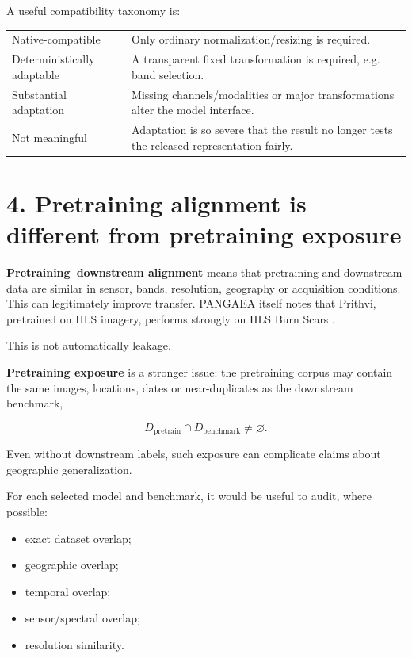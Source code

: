\documentclass[11pt,a4paper]{article}
\begin{document}
A useful compatibility taxonomy is:

\begin{center}
\begin{tabular}{>{\raggedright\arraybackslash}p{3.6cm}
                >{\raggedright\arraybackslash}p{9.0cm}}
\toprule
Native-compatible & Only ordinary normalization/resizing is required. \\
Deterministically adaptable & A transparent fixed transformation is required, e.g. band selection. \\
Substantial adaptation & Missing channels/modalities or major transformations alter the model interface. \\
Not meaningful & Adaptation is so severe that the result no longer tests the released representation fairly. \\
\bottomrule
\end{tabular}
\end{center}

\section{4. Pretraining alignment is different from pretraining exposure}

\textbf{Pretraining--downstream alignment} means that pretraining and downstream data are similar in
sensor, bands, resolution, geography or acquisition conditions. This can legitimately improve transfer.
PANGAEA itself notes that Prithvi, pretrained on HLS imagery, performs strongly on HLS Burn Scars
\cite{pangaea}.

This is not automatically leakage.

\textbf{Pretraining exposure} is a stronger issue: the pretraining corpus may contain the same images,
locations, dates or near-duplicates as the downstream benchmark,

\[
D_{\mathrm{pretrain}}\cap D_{\mathrm{benchmark}}\neq\varnothing.
\]

Even without downstream labels, such exposure can complicate claims about geographic generalization.

For each selected model and benchmark, it would be useful to audit, where possible:

\begin{itemize}
    \item exact dataset overlap;
    \item geographic overlap;
    \item temporal overlap;
    \item sensor/spectral overlap;
    \item resolution similarity.
\end{itemize}
\end{document}

